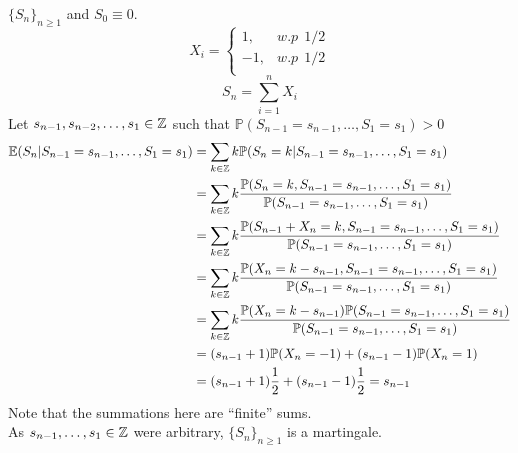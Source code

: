 \documentclass[main]{subfiles}
\begin{document}
\ex $\{S_n\}_{n \geq 1}$ and $S_0 \equiv 0$.
\begin{equation*}
    X_i=
    \begin{cases}
        1 ,  & w.p ~~ 1/2 \\
        -1 , & w.p ~~1/2  \\
    \end{cases}
\end{equation*}
$$S_n=\sum_{i=1}^n X_i$$
Let $s_{n-1},s_{n-2}, \ldots, s_1 \in \mathbb Z$ such that $\mathbb{P} (S_{n-1}=s_{n-1}, \ldots, S_1=s_1)>0$
\begin{align*}
    \mathbb{E} (S_n |S_{n-1}=s_{n-1}, \ldots, S_1=s_1) & = \sum_{k \in \mathbb Z} k \mathbb{P} (S_n =k |S_{n-1}=s_{n-1}, \ldots, S_1=s_1)                                                                        \\
                                                       & = \sum_{k \in \mathbb Z} k \frac{\mathbb{P}(S_n =k ,S_{n-1}=s_{n-1}, \ldots, S_1=s_1)}{\mathbb{P}(S_{n-1}=s_{n-1}, \ldots, S_1=s_1)}                    \\
                                                       & = \sum_{k \in \mathbb Z} k \frac{\mathbb{P}(S_{n-1} +X_n =k ,S_{n-1}=s_{n-1}, \ldots, S_1=s_1)}{\mathbb{P}(S_{n-1}=s_{n-1}, \ldots, S_1=s_1)}           \\
                                                       & = \sum_{k \in \mathbb Z} k \frac{\mathbb{P}(X_n =k -s_{n-1} ,S_{n-1}=s_{n-1}, \ldots, S_1=s_1)}{\mathbb{P}(S_{n-1}=s_{n-1}, \ldots, S_1=s_1)}           \\
                                                       & = \sum_{k \in \mathbb Z} k \frac{\mathbb{P}(X_n =k-s_{n-1}) \mathbb{P}(S_{n-1}=s_{n-1}, \ldots, S_1=s_1)}{\mathbb{P}(S_{n-1}=s_{n-1}, \ldots, S_1=s_1)} \\
                                                       & = (s_{n-1}+1) \mathbb{P} (X_n=-1)+ (s_{n-1}-1) \mathbb{P} (X_n=1)                                                                                \\
                                                       & = (s_{n-1}+1) \frac{1}{2}+ (s_{n-1}-1) \frac{1}{2} =s_{n-1}                                                                                      \\
\end{align*}
Note that the summations here are ``finite'' sums.\\
As $s_{n-1},\ldots, s_1 \in \mathbb Z$ were arbitrary, $\{S_n\}_{n \geq 1}$ is a martingale.\\
\end{document}
